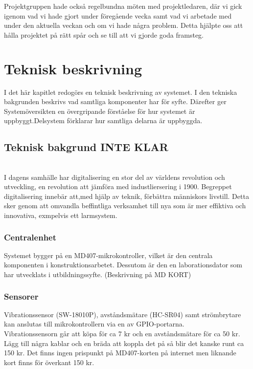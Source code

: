 \documentclass{article}
\begin{document}
Projektgruppen hade också regelbundna möten med projektledaren,
där vi gick igenom vad vi hade gjort under föregående vecka samt vad vi arbetade med under den aktuella veckan och om vi hade några problem.
Detta hjälpte oss att hålla projektet på rätt spår och se till att vi gjorde goda framsteg.

\newpage
\section{Teknisk beskrivning}
I det här kapitlet redogörs en teknisk beskrivning av systemet. 
I den tekniska bakgrunden beskrivs vad samtliga komponenter har för syfte.
Därefter ger Systemöversikten en övergripande förståelse för hur systemet är uppbyggt.Delsystem förklarar hur samtliga delarna är uppbyggda.

\subsection{Teknisk bakgrund INTE KLAR }\\
I dagens samhälle har digitalisering en stor del av världens revolution och utveckling, en revolution att jämföra med industliersering i 1900. Begreppet digitalisering innebär att,med hjälp av teknik, förbättra människors livstill. Detta sker genom att omvandla beffintliga verksamhet till nya som är mer effiktiva och innovativa, exmpelvis ett larmsystem. 

\subsubsection{Centralenhet}
Systemet bygger på en MD407-mikrokontroller, vilket är den centrala komponenten i konstruktionsarbetet. 
Dessutom är den en laborationsdator som har utvecklats i utbildningssyfte. (Beskrivning på MD KORT)

\subsubsection{Sensorer}
Vibrationssensor (SW-18010P), avståndsmätare (HC-SR04) samt strömbrytare kan anslutas till mikrokontrollern via en av GPIO-portarna.\\
Vibrationssensorn går att köpa för ca 7 kr och en avståndsmätare för ca 50 kr.
Lägg till några kablar och en bräda att koppla det på så blir det kanske runt ca 150 kr. 
Det finns ingen prispunkt på MD407-korten på internet men liknande kort finns för överkant 150 kr.
\end{document}
